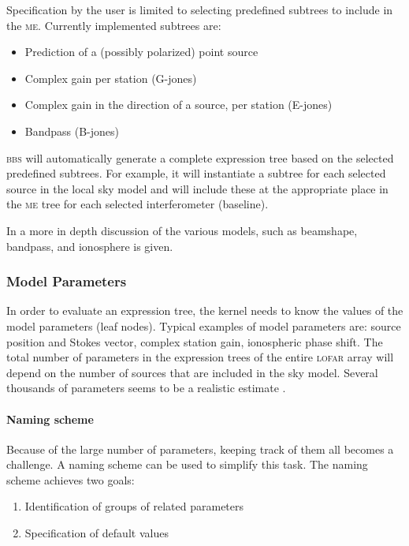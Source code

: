 \documentclass[10pt]{lofar}
\newcommand{\bbs}{\textsc{bbs}\xspace}
\newcommand{\lofar}{\textsc{lofar}\xspace}
\newcommand{\me}{\textsc{me}\xspace}
\begin{document}
Specification by the user is limited to selecting predefined subtrees to include in the \me. Currently implemented subtrees are:
\begin{itemize}
\item Prediction of a (possibly polarized) point source
\item Complex gain per station (G-jones)
\item Complex gain in the direction of a source, per station (E-jones)
\item Bandpass (B-jones)
\end{itemize}

\bbs will automatically generate a complete expression tree based on the selected predefined subtrees. For example, it will instantiate a subtree for each selected source in the local sky model and will include these at the appropriate place in the \me tree for each selected interferometer (baseline).

In \cite[sec. 2]{LOFAR-ASTRON-SDD-050} a more in depth discussion of the various models, such as beamshape, bandpass, and ionosphere is given. 

\subsubsection{Model Parameters}
In order to evaluate an expression tree, the kernel needs to know the values of the model parameters (leaf nodes). Typical examples of model parameters are: source position and Stokes vector, complex station gain, ionospheric phase shift. The total number of parameters in the expression trees of the entire \lofar array will depend on the number of sources that are included in the sky model. Several thousands of parameters seems to be a realistic estimate \cite{LOFAR-ASTRON-SDD-052}.

\paragraph{Naming scheme}
Because of the large number of parameters, keeping track of them all becomes a challenge. A naming scheme can be used to simplify this task. The naming scheme achieves two goals:
\begin{enumerate}
\item Identification of groups of related parameters
\item Specification of default values
\end{enumerate}
\end{document}
